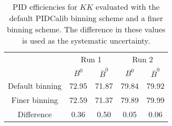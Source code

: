\begin{table}
    \centering
    \begin{tabular}{ccccc}
    \toprule
& \multicolumn{2}{c}{Run 1} & \multicolumn{2}{c}{Run 2}\\
& $B^0$ & $\bar{B}^0$ & $B^0$ & $\bar{B}^0$\\
    \midrule
Default binning & 72.95 & 71.87 & 79.84 & 79.92\\
Finer binning & 72.59 & 71.37 & 79.89 & 79.99\\
Difference & 0.36 & 0.50 & 0.05 & 0.06\\
    \bottomrule
    \end{tabular}
    \caption{PID efficiencies for $KK$ evaluated with the default PIDCalib binning scheme and a finer binning scheme. The difference in these values is used as the systematic uncertainty.}
\label{tab:final_PID_KK}
\end{table}
